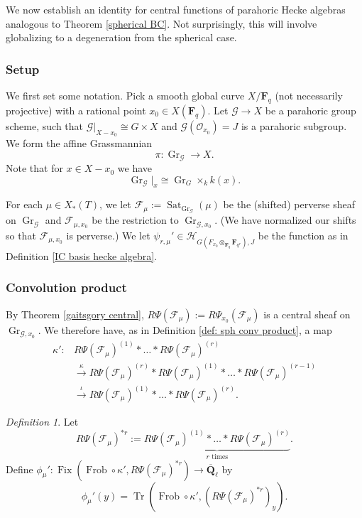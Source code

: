 \documentclass[reqno]{amsart}
\numberwithin{equation}{section}
\newcommand{\F}{\mathbf{F}}
\newcommand{\Q}{\mathbf{Q}}
\newcommand{\ol}[1]{\overline{#1}}
\newcommand{\Cal}[1]{\mathcal{#1}}
\newcommand{\co}{\colon}
\DeclareMathOperator{\Frob}{Frob}
\DeclareMathOperator{\Tr}{Tr}
\DeclareMathOperator{\Gr}{Gr}
\DeclareMathOperator{\Fix}{Fix}
\DeclareMathOperator{\Sat}{Sat}
\theoremstyle{remark}
\newtheorem{defn}[thm]{Definition}
\numberwithin{equation}{section}
\begin{document}
We now establish an identity for central functions of parahoric Hecke algebras analogous to Theorem \ref{spherical BC}. Not surprisingly, this will involve globalizing to a degeneration from the spherical case. 

\subsubsection{Setup}\label{sssec: BC center parahoric setup} We first set some notation. Pick a smooth global curve $X/\F_q$ (not necessarily projective) with a rational point $x_0 \in X(\F_q)$. Let $\Cal{G} \rightarrow X$ be a parahoric group scheme, such that $\Cal{G}|_{X-x_0} \cong G \times X$ and $\Cal{G}(\Cal{O}_{x_0}) = J$ is a parahoric subgroup. We form the affine Grassmannian 
\[
\pi \co \Gr_{\Cal{G}} \rightarrow X.
\]
Note that for $x \in X-x_0$ we have 
\[
\Gr_{\Cal{G}}|_x \cong \Gr_G \times_k k(x).
\]

For each $\mu \in X_*(T)$, we let $\Cal{F}_{\mu} := \Sat_{\Gr_{\Cal{G}}}(\mu)$ be the (shifted) perverse sheaf on $\Gr_{\Cal{G}}$ and $\Cal{F}_{\mu, x_0}$ be the restriction to $\Gr_{\Cal{G}, x_0}$. (We have normalized our shifts so that $\Cal{F}_{\mu, x_0}$ is perverse.) We let $\psi_{r,\mu}' \in \Cal{H}_{G(F_{x_0} \otimes_{\F_q} \F_{q^r}),J}$ be the function as in Definition \ref{IC basis hecke algebra}.




\subsubsection{Convolution product}By Theorem \ref{gaitsgory central}, $R\Psi(\Cal{F}_{\mu}) := R\Psi_{x_0}(\Cal{F}_{\mu})$ is a central sheaf on $\Gr_{\Cal{G}, x_0}$. We therefore have, as in Definition \ref{def: sph conv product}, a map 
\begin{align*}
\kappa' \co & R\Psi(\Cal{F}_{\mu})^{(1)} * \ldots * R\Psi(\Cal{F}_{\mu})^{(r)}   \\
& \xrightarrow{\kappa} R\Psi(\Cal{F}_{\mu})^{(r)} * R\Psi(\Cal{F}_{\mu})^{(1)} * \ldots * R\Psi(\Cal{F}_{\mu})^{(r-1)} \\
& \xrightarrow{\iota} R\Psi(\Cal{F}_{\mu})^{(1)} * \ldots * R\Psi(\Cal{F}_{\mu})^{(r)}.
\end{align*}




\begin{defn}

Let 
\[
R\Psi(\Cal{F}_{\mu})^{*r} := \underbrace{R\Psi(\Cal{F}_{\mu})^{(1)} * \ldots * R\Psi(\Cal{F}_{\mu})^{(r)}   }_{r \text{ times}}.
\]
Define $\phi_{\mu}' \co \Fix(\Frob \circ \kappa', R\Psi(\Cal{F}_{\mu})^{*r} ) \rightarrow \ol{\Q}_{\ell} $ by
\[
\phi_{\mu}'(y) =  \Tr(\Frob \circ \kappa', (R\Psi(\Cal{F}_{\mu})^{*r})_y).
\]
\end{defn}
\end{document}
